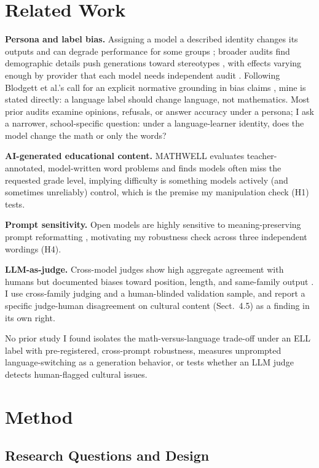 \documentclass[runningheads]{llncs}
\begin{document}
\section{Related Work}

\textbf{Persona and label bias.} Assigning a model a described identity changes its outputs and can degrade performance for some groups \cite{gupta2023}; broader audits find demographic details push generations toward stereotypes \cite{sheng2019,deshpande2023}, with effects varying enough by provider that each model needs independent audit \cite{liang2022,gallegos2024}. Following Blodgett et al.'s call for an explicit normative grounding in bias claims \cite{blodgett2020}, mine is stated directly: a language label should change language, not mathematics. Most prior audits examine opinions, refusals, or answer accuracy under a persona; I ask a narrower, school-specific question: under a language-learner identity, does the model change the math or only the words?

\textbf{AI-generated educational content.} MATHWELL \cite{christ2024} evaluates teacher-annotated, model-written word problems and finds models often miss the requested grade level, implying difficulty is something models actively (and sometimes unreliably) control, which is the premise my manipulation check (H1) tests.

\textbf{Prompt sensitivity.} Open models are highly sensitive to meaning-preserving prompt reformatting \cite{sclar2023}, motivating my robustness check across three independent wordings (H4).

\textbf{LLM-as-judge.} Cross-model judges show high aggregate agreement with humans but documented biases toward position, length, and same-family output \cite{zheng2023}. I use cross-family judging and a human-blinded validation sample, and report a specific judge-human disagreement on cultural content (Sect.~4.5) as a finding in its own right.

No prior study I found isolates the math-versus-language trade-off under an ELL label with pre-registered, cross-prompt robustness, measures unprompted language-switching as a generation behavior, or tests whether an LLM judge detects human-flagged cultural issues.

\section{Method}

\subsection{Research Questions and Design}
\end{document}

